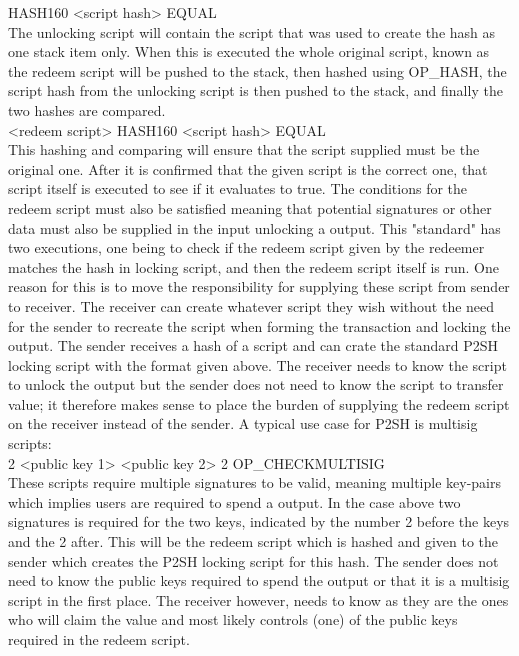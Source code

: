 HASH160 <script hash> EQUAL
\\

The unlocking script will contain the script that was used to create the hash as one stack item only. When this is executed the whole original script, known as the redeem script will be pushed to the stack, then hashed using OP\_HASH, the script hash from the unlocking script is then pushed to the stack, and finally the two hashes are compared.
\\

<redeem script> HASH160 <script hash> EQUAL
\\

This hashing and comparing will ensure that the script supplied must be the original one. After it is confirmed that the given script is the correct one, that script itself is executed to see if it evaluates to true. The conditions for the redeem script must also be satisfied meaning that potential signatures or other data must also be supplied in the input unlocking a output. This "standard" has two executions, one being to check if the redeem script given by the redeemer matches the hash in locking script, and then the redeem script itself is run.
One reason for this is to move the responsibility for supplying these script from sender to receiver. The receiver can create whatever script they wish without the need for the sender to recreate the script when forming the transaction and locking the output. The sender receives a hash of a script and can crate the standard P2SH locking script with the format given above. The receiver needs to know the script to unlock the output but the sender does not need to know the script to transfer value; it therefore makes sense to place the burden of supplying the redeem script on the receiver instead of the sender. A typical use case for P2SH is multisig scripts: 
\\

2 <public key 1> <public key 2> 2 OP\_CHECKMULTISIG
\\

These scripts require multiple signatures to be valid, meaning multiple key-pairs which implies users are required to spend a output.
In the case above two signatures is required for the two keys, indicated by the number 2 before the keys and the 2 after.
This will be the redeem script which is hashed and given to the sender which creates the P2SH locking script for this hash.
The sender does not need to know the public keys required to spend the output or that it is a multisig script in the first place. The receiver however, needs to know as they are the ones who will claim the value and most likely controls (one) of the public keys required in the redeem script.

